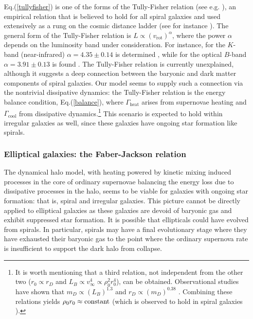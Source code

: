 \documentclass[12pt]{article}
\begin{document}
{{Eq.(\ref{tullyfisher}) is one of the forms of the Tully-Fisher relation (see e.g. \cite{webster}), an empirical relation that is believed to hold for all spiral galaxies and used extensively as a rung on the cosmic distance ladder (see for instance \cite{maoz}). The general form of the Tully-Fisher relation is $L \propto \left ( v _{\text{rot}} \right ) ^{\alpha}$, where the power $\alpha$ depends on the luminosity band under consideration. For instance, for the $K$-band (near-infrared) $\alpha = 4.35 \pm 0.14$ is determined \cite{webster}, while for the optical $B$-band $\alpha = 3.91 \pm 0.13$ is found \cite{webster}. The Tully-Fisher relation is currently unexplained, although it suggests a deep connection between the baryonic and dark matter components of spiral galaxies. Our model seems to supply such a connection via the nontrivial dissipative dynamics: the Tully-Fisher relation is the energy balance condition, Eq.(\ref{balance}), where $\Gamma _{\text{heat}}$ arises from supernovae heating and $\Gamma _{\text{cool}}$ from dissipative dynamics.\footnote{It is worth mentioning that a third relation, not independent from the other two ($r _0 \propto r _D$ and $L _B \propto v _{\infty} ^4 \propto \rho _0 ^2r _0 ^4$), can be obtained. Observational studies have shown that $m _D \propto \left ( L _B \right ) ^{1.3}$ \cite{shankar} and $r_D \propto \left ( m _D \right ) ^{0.38}$ \cite{saluccird}. Combining these relations yields $\rho _0 r _0 \approx {\rm constant}$ (which is observed to hold in spiral galaxies \cite{kormendy}).} This scenario is expected to hold within irregular galaxies as well, since these galaxies have ongoing star formation like spirals.

\subsubsection{Elliptical galaxies: the Faber-Jackson relation}

The dynamical halo model, with heating powered by kinetic mixing induced processes in the core of ordinary supernovae balancing the energy loss due to dissipative processes in the halo, seems to be
viable for galaxies with ongoing star formation: that is, spiral and irregular galaxies. This picture cannot be directly applied to elliptical galaxies as these galaxies are devoid of baryonic gas and exhibit suppressed star formation. It is possible that ellipticals could have evolved from spirals. In particular, spirals may have a final evolutionary stage where they have exhausted their baryonic gas to the point where the ordinary supernova rate is insufficient to support the dark halo from collapse.

}}
\end{document}
